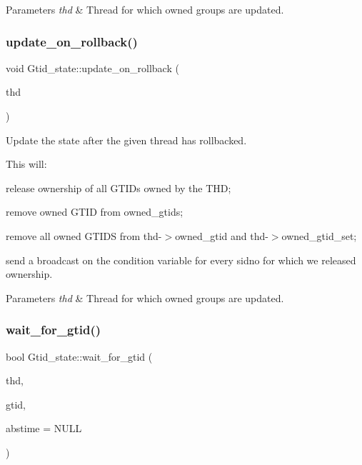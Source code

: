 \begin{DoxyParams}{Parameters}
{\em thd} & Thread for which owned groups are updated. \\
\hline
\end{DoxyParams}
\mbox{\label{classGtid__state_a82dacb8e665689ad80e4541cea325897}} 
\subsubsection{\texorpdfstring{update\+\_\+on\+\_\+rollback()}{update\_on\_rollback()}}
{\footnotesize\ttfamily void Gtid\+\_\+state\+::update\+\_\+on\+\_\+rollback (\begin{DoxyParamCaption}\item[{T\+HD $\ast$}]{thd }\end{DoxyParamCaption})}

Update the state after the given thread has rollbacked.

This will\+:
\begin{DoxyItemize}
\item release ownership of all G\+T\+I\+Ds owned by the T\+HD;
\item remove owned G\+T\+ID from owned\+\_\+gtids;
\item remove all owned G\+T\+I\+DS from thd-\/$>$owned\+\_\+gtid and thd-\/$>$owned\+\_\+gtid\+\_\+set;
\item send a broadcast on the condition variable for every sidno for which we released ownership.
\end{DoxyItemize}


\begin{DoxyParams}{Parameters}
{\em thd} & Thread for which owned groups are updated. \\
\hline
\end{DoxyParams}
\mbox{\label{classGtid__state_ae54492cf7e8c0f562de64abac2721a37}} 
\subsubsection{\texorpdfstring{wait\+\_\+for\+\_\+gtid()}{wait\_for\_gtid()}}
{\footnotesize\ttfamily bool Gtid\+\_\+state\+::wait\+\_\+for\+\_\+gtid (\begin{DoxyParamCaption}\item[{T\+HD $\ast$}]{thd,  }\item[{const \mbox{\hyperlink{structGtid}{Gtid}} \&}]{gtid,  }\item[{struct timespec $\ast$}]{abstime = {\ttfamily NULL} }\end{DoxyParamCaption})}

